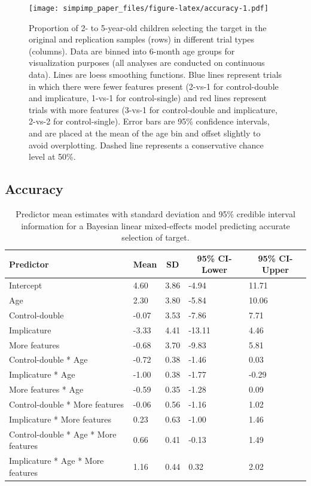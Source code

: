 \documentclass[mask,man]{apa6}
\theoremstyle{definition}
\theoremstyle{definition}
\theoremstyle{definition}
\theoremstyle{remark}
\begin{document}
\begin{figure}
\centering
\texttt{[image: simpimp\_paper\_files/figure-latex/accuracy-1.pdf]}
\caption{\label{fig:accuracy}Proportion of 2- to 5-year-old children
selecting the target in the original and replication samples (rows) in
different trial types (columns). Data are binned into 6-month age groups
for visualization purposes (all analyses are conducted on continuous
data). Lines are loess smoothing functions. Blue lines represent trials
in which there were fewer features present (2-vs-1 for control-double
and implicature, 1-vs-1 for control-single) and red lines represent
trials with more features (3-vs-1 for control-double and implicature,
2-vs-2 for control-single). Error bars are 95\% confidence intervals,
and are placed at the mean of the age bin and offset slightly to avoid
overplotting. Dashed line represents a conservative chance level at
50\%.}
\end{figure}

\subsection{Accuracy}\label{accuracy}

\begin{table}[tbp]
\begin{center}
\begin{threeparttable}
\caption{\label{tab:brmacc}Predictor mean estimates with standard deviation and 95\% credible interval information for a Bayesian linear mixed-effects model predicting accurate selection of target.}
\begin{tabular}{lllll}
\toprule
Predictor & \multicolumn{1}{c}{Mean} & \multicolumn{1}{c}{SD} & \multicolumn{1}{c}{95\% CI-Lower} & \multicolumn{1}{c}{95\% CI-Upper}\\
\midrule
Intercept & 4.60 & 3.86 & -4.94 & 11.71\\
Age & 2.30 & 3.80 & -5.84 & 10.06\\
Control-double & -0.07 & 3.53 & -7.86 & 7.71\\
Implicature & -3.33 & 4.41 & -13.11 & 4.46\\
More features & -0.68 & 3.70 & -9.83 & 5.81\\
Control-double * Age & -0.72 & 0.38 & -1.46 & 0.03\\
Implicature * Age & -1.00 & 0.38 & -1.77 & -0.29\\
More features * Age & -0.59 & 0.35 & -1.28 & 0.09\\
Control-double * More features & -0.06 & 0.56 & -1.16 & 1.02\\
Implicature * More features & 0.23 & 0.63 & -1.00 & 1.46\\
Control-double * Age * More features & 0.66 & 0.41 & -0.13 & 1.49\\
Implicature * Age * More features & 1.16 & 0.44 & 0.32 & 2.02\\
\bottomrule
\end{tabular}
\end{threeparttable}
\end{center}
\end{table}
\end{document}

